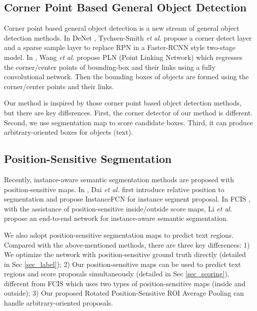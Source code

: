 \documentclass[10pt,twocolumn,letterpaper]{article}
\begin{document}
\subsection{Corner Point Based General Object Detection}

Corner point based general object detection is a new stream of general object detection methods. In DeNet \cite{Tychsen-Smith_2017_ICCV}, Tychsen-Smith \emph{et al.} propose a corner detect layer and a sparse sample layer to replace RPN in a Faster-RCNN style two-stage model. In \cite{wang2017point}, Wang \emph{et al.} propose PLN (Point Linking Network) which regresses the corner/center points of bounding-box and their links using a fully convolutional network. Then the bounding boxes of objects are formed using the corner/center points and their links.

Our method is inspired by those corner point based object detection methods, but there are key differences. First, the corner detector of our method is different. Second, we use segmentation map to score candidate boxes. Third, it can produce arbitrary-oriented boxes for objects (text).



\subsection{Position-Sensitive Segmentation}

Recently, instance-aware semantic segmentation methods are proposed with position-sensitive maps. In \cite{dai2016instance}, Dai \emph{et al.} first introduce relative position to segmentation and propose InstanceFCN for instance segment proposal. In FCIS \cite{Li_2017_CVPR}, with the assistance of position-sensitive inside/outside score maps, Li \emph{et al.} propose an end-to-end network for instance-aware semantic segmentation.



We also adopt position-sensitive segmentation maps to predict text regions. Compared with the above-mentioned methods, there are three key differences: 1) We optimize the network with position-sensitive ground truth directly (detailed in Sec  \ref{sec_label}); 2)  Our position-sensitive maps can be used to predict text regions and score proposals simultaneously (detailed in Sec \ref{sec_scoring}), different from FCIS which uses two types of   position-sensitive maps (inside and outside); 3) Our proposed Rotated Position-Sensitive ROI Average Pooling can handle arbitrary-oriented proposals.
\end{document}
